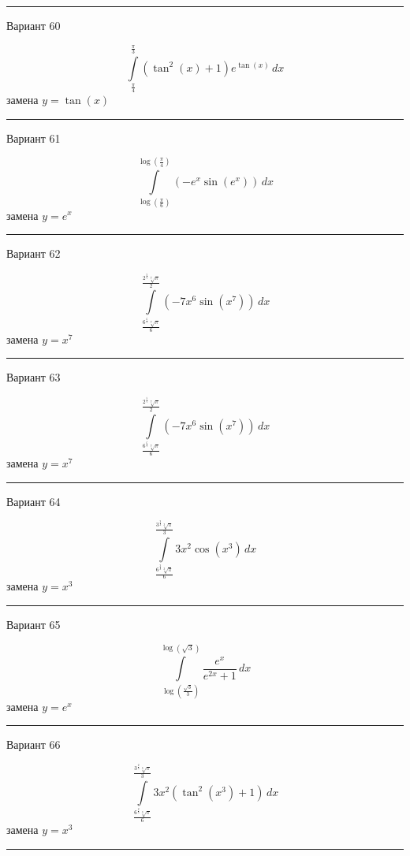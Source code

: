 \documentclass[11pt]{report}
\begin{document}
\rule{\textwidth}{.2mm}

Вариант 60

$$\int\limits_{\frac{\pi}{4}}^{\frac{\pi}{3}} \left(\tan^{2}{\left(x \right)} + 1\right) e^{\tan{\left(x \right)}}\, dx$$
замена $y = \tan{\left(x \right)}$



\rule{\textwidth}{.2mm}

Вариант 61

$$\int\limits_{\log{\left(\frac{\pi}{6} \right)}}^{\log{\left(\frac{\pi}{4} \right)}} \left(- e^{x} \sin{\left(e^{x} \right)}\right)\, dx$$
замена $y = e^{x}$



\rule{\textwidth}{.2mm}

Вариант 62

$$\int\limits_{\frac{6^{\frac{6}{7}} \sqrt[7]{\pi}}{6}}^{\frac{2^{\frac{5}{7}} \sqrt[7]{\pi}}{2}} \left(- 7 x^{6} \sin{\left(x^{7} \right)}\right)\, dx$$
замена $y = x^{7}$



\rule{\textwidth}{.2mm}

Вариант 63

$$\int\limits_{\frac{6^{\frac{6}{7}} \sqrt[7]{\pi}}{6}}^{\frac{2^{\frac{5}{7}} \sqrt[7]{\pi}}{2}} \left(- 7 x^{6} \sin{\left(x^{7} \right)}\right)\, dx$$
замена $y = x^{7}$



\rule{\textwidth}{.2mm}

Вариант 64

$$\int\limits_{\frac{6^{\frac{2}{3}} \sqrt[3]{\pi}}{6}}^{\frac{3^{\frac{2}{3}} \sqrt[3]{\pi}}{3}} 3 x^{2} \cos{\left(x^{3} \right)}\, dx$$
замена $y = x^{3}$



\rule{\textwidth}{.2mm}

Вариант 65

$$\int\limits_{\log{\left(\frac{\sqrt{3}}{3} \right)}}^{\log{\left(\sqrt{3} \right)}} \frac{e^{x}}{e^{2 x} + 1}\, dx$$
замена $y = e^{x}$



\rule{\textwidth}{.2mm}

Вариант 66

$$\int\limits_{\frac{6^{\frac{2}{3}} \sqrt[3]{\pi}}{6}}^{\frac{3^{\frac{2}{3}} \sqrt[3]{\pi}}{3}} 3 x^{2} \left(\tan^{2}{\left(x^{3} \right)} + 1\right)\, dx$$
замена $y = x^{3}$



\rule{\textwidth}{.2mm}
\end{document}
